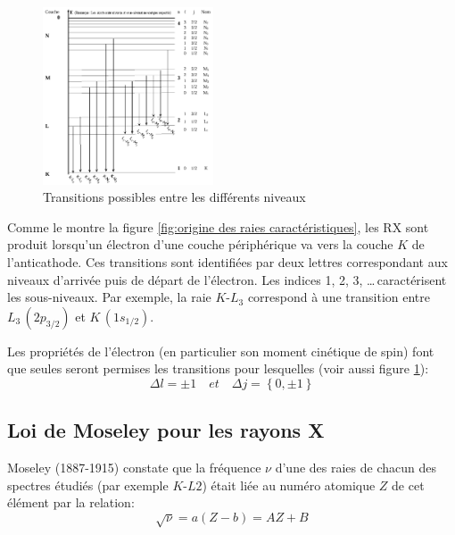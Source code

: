 \documentclass{article}
\begin{document}
\setlength{\intextsep}{0pt}
\begin{figure}
    \centering
    \vspace{-1.5cm}
    \includegraphics[width=0.45\textwidth]{Fig/Grotrian-RX.png} 
    \caption{Transitions possibles entre les différents niveaux}
    \label{fig:Transitions possibles}
\end{figure}
\vspace{5mm}
Comme le montre la figure \ref{fig:origine des raies caractéristiques}, 
les RX sont produit lorsqu'un électron d'une couche périphérique va vers la couche $K$ de l'anticathode. 
Ces transitions sont identifiées par deux lettres correspondant aux niveaux d'arrivée puis de départ de l'électron. 
Les indices 1, 2, 3, \dots \,caractérisent les sous-niveaux. 
Par exemple, la raie $K\text{-}L_3$ correspond à une transition entre $L_3\, (2p_{3/2})$ et $K\, (1s_{1/2})$. 

Les propriétés de l'électron (en particulier son moment cinétique de spin) font que seules seront permises 
les transitions pour lesquelles (voir aussi figure \ref{fig:Transitions possibles}):
$$\boxed{\Delta l = \pm 1 \quad et \quad \Delta j = \left\{0, \pm 1\right\}}$$  


\newpage
\clearpage

\subsection{Loi de Moseley pour les rayons X}

Moseley (1887-1915) constate que la fréquence $\nu$ d'une des raies de chacun des 
spectres étudiés (par exemple $K$-$L2$) était liée au numéro atomique $Z$ de cet élément par 
la relation:
$$\sqrt{\nu}=a(Z-b)=AZ+B$$
\end{document}
